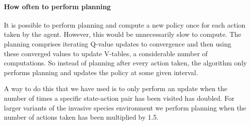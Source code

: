 \paragraph{How often to perform planning}
\label{sec:mbie_perform_planning}

It is possible to perform planning and compute a new policy once for each
action taken by the agent. However, this would be unnecessarily slow to
compute. The planning comprises iterating Q-value updates to convergence and
then using these converged values to update V-tables, a considerable number of
computations. So instead of planning after every action taken, the algorithm
only performs planning and updates the policy at some given interval. 

A way to do this that we have used is to only perform an update when the
number of times a specific state-action pair has been visited has doubled. For
larger variants of the invasive species environment we perform planning when
the number of actions taken has been multiplied by 1.5.
